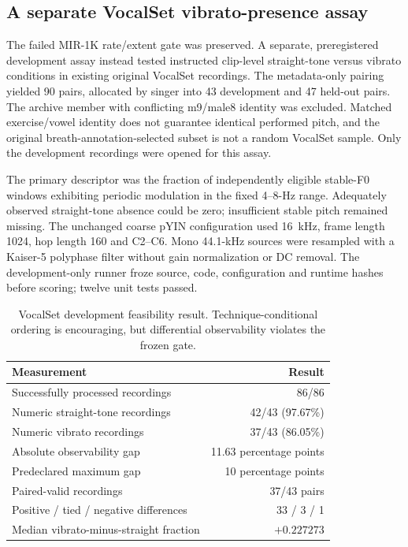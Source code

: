 \subsection{A separate VocalSet vibrato-presence assay}
\label{sec:vocalset-presence-dev}

The failed MIR-1K rate/extent gate was preserved. A separate, preregistered
development assay instead tested instructed clip-level straight-tone versus
vibrato conditions in existing original VocalSet recordings. The metadata-only
pairing yielded 90 pairs, allocated by singer into 43 development and 47 held-out
pairs. The archive member with conflicting m9/male8 identity was excluded.
Matched exercise/vowel identity does not guarantee identical performed pitch,
and the original breath-annotation-selected subset is not a random VocalSet
sample. Only the development recordings were opened for this assay.

The primary descriptor was the fraction of independently eligible stable-F0
windows exhibiting periodic modulation in the fixed 4--8-Hz range. Adequately
observed straight-tone absence could be zero; insufficient stable pitch remained
missing. The unchanged coarse pYIN configuration used 16~kHz, frame length
1024, hop length 160 and C2--C6. Mono 44.1-kHz sources were resampled with a
Kaiser-5 polyphase filter without gain normalization or DC removal. The
development-only runner froze source, code, configuration and runtime hashes
before scoring; twelve unit tests passed.

\begin{table}[htbp]
\centering\small
\caption{VocalSet development feasibility result. Technique-conditional ordering
is encouraging, but differential observability violates the frozen gate.}
\label{tab:vocalset-presence-dev}
\begin{tabular}{lr}
\toprule Measurement & Result \\
\midrule
Successfully processed recordings & 86/86 \\
Numeric straight-tone recordings & 42/43 (97.67\%) \\
Numeric vibrato recordings & 37/43 (86.05\%) \\
Absolute observability gap & 11.63 percentage points \\
Predeclared maximum gap & 10 percentage points \\
Paired-valid recordings & 37/43 pairs \\
Positive / tied / negative differences & 33 / 3 / 1 \\
Median vibrato-minus-straight fraction & $+0.227273$ \\
\bottomrule
\end{tabular}
\end{table}

